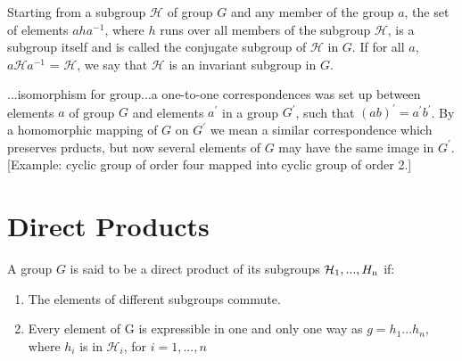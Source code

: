 Starting from a subgroup $\mathcal H$ of group $G$ and any member of
the group $a$, the set of elements $aha^{-1}$, where $h$ runs over all
members of the subgroup $\mathcal H$, is a subgroup itself and is
called the conjugate subgroup of $\mathcal H$ in $G$. If for all $a$,
$a{\mathcal H} a^{-1}$ = $\mathcal H$, we say that $\mathcal H$ is an
invariant subgroup in $G$.

...isomorphism for group...a one-to-one correspondences was set up
between elements $a$ of group $G$ and elements $a^\prime$ in a group
$G^\prime$, such that $(ab)^\prime = a^\prime b^\prime$. By a
homomorphic mapping of $G$ on $G^\prime$ we mean a similar
correspondence which preserves prducts, but now several elements of
$G$ may have the same image in $G^\prime$. [Example: cyclic group of
  order four mapped into cyclic group of order 2.]

\section{Direct Products}

A group $G$ is said to be a direct product of its subgroups ${\mathcal
  H_{\rm 1},...,H_{\rm n}}$ if:

\begin{enumerate}
\item The elements of different subgroups commute.
\item Every element of G is expressible in one and only one way as
  $g = h_1...h_n$, where $h_i$ is in ${\mathcal H}_i$, for $i = 1,...,n$
\end{enumerate}
